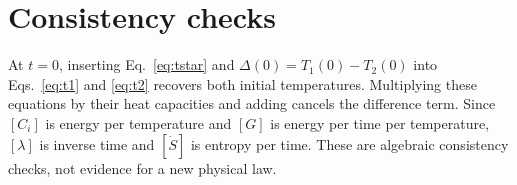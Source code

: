 \section{Consistency checks}\label{app:checks}
At $t=0$, inserting Eq.~\eqref{eq:tstar} and $\Delta(0)=T_1(0)-T_2(0)$ into Eqs.~\eqref{eq:t1} and \eqref{eq:t2} recovers both initial temperatures. Multiplying these equations by their heat capacities and adding cancels the difference term. Since $[C_i]$ is energy per temperature and $[G]$ is energy per time per temperature, $[\lambda]$ is inverse time and $[\dot S]$ is entropy per time. These are algebraic consistency checks, not evidence for a new physical law.
